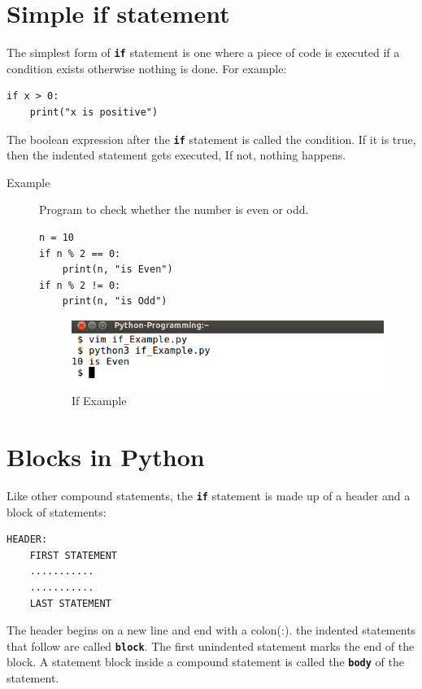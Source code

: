 \documentclass[11pt,a4paper]{article}
\newcommand{\Code}[1]{\textbf{\texttt{#1}}}
\begin{document}
\section*{Simple if statement}
The simplest form of \Code{if} statement is one where a piece of code is executed if a condition exists otherwise nothing is done. For example:
\begin{verbatim}
if x > 0:
    print("x is positive")
\end{verbatim}
The boolean expression after the \Code{if} statement is called the condition. If it is true, then the indented statement gets executed, If not, nothing happens.

\begin{description}
\item[Example ] Program to check whether the number is even or odd.
\begin{lstlisting}
n = 10
if n % 2 == 0:
    print(n, "is Even")
if n % 2 != 0:
    print(n, "is Odd")
\end{lstlisting}

\begin{figure}[ht]
\begin{center}
\includegraphics[scale=0.4]{Output_ifExample.png}
\caption{If Example}
\label{If_Example}\end{center}
\end{figure}
\end{description}

\section*{Blocks in Python}
Like other compound statements, the \Code{if} statement is made up of a header and a block of statements:
\begin{verbatim}
HEADER:
    FIRST STATEMENT
    ...........
    ...........
    LAST STATEMENT
\end{verbatim}
The header begins on a new line and end with a colon(:). the indented statements that follow are called \Code{block}. The first unindented statement marks the end of the block. A statement block inside a compound statement is called the \Code{body} of the statement.
\end{document}
